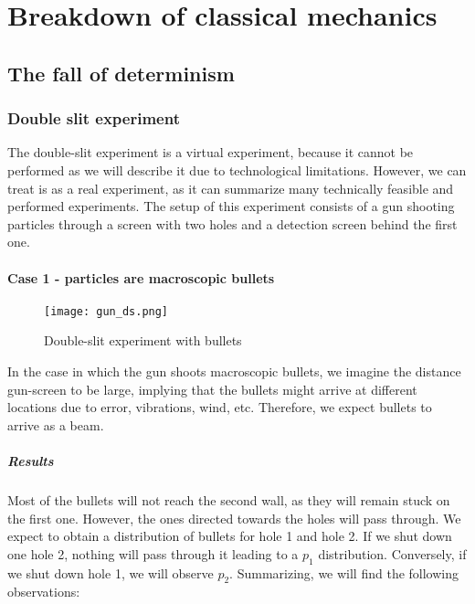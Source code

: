 \graphicspath{{chapters/02/}}
\chapter{Breakdown of classical mechanics}

\section{The fall of determinism}

  \subsection{Double slit experiment}
  The double-slit experiment is a virtual experiment, because it cannot be performed as we will describe it due to technological limitations.
  However, we can treat is as a real experiment, as it can summarize many technically feasible and performed experiments.
  The setup of this experiment consists of a gun shooting particles through a screen with two holes and a detection screen behind the first one.

  \subsubsection{Case 1 - particles are macroscopic bullets}

  \begin{figure}[h!]
    \centering
    \texttt{[image: gun\_ds.png]}
    \caption{\label{fig:gun_ds} Double-slit experiment with bullets}
  \end{figure}

  In the case in which the gun shoots macroscopic bullets, we imagine the distance gun-screen to be large, implying that the bullets might arrive at different locations due to error, vibrations, wind, etc.
  Therefore, we expect bullets to arrive as a beam.

    \paragraph{Results}
    Most of the bullets will not reach the second wall, as they will remain stuck on the first one.
    However, the ones directed towards the holes will pass through.
    We expect to obtain a distribution of bullets for hole 1 and hole 2.
    If we shut down one hole 2, nothing will pass through it leading to a $p_1$ distribution.
    Conversely, if we shut down hole 1, we will observe $p_2$.
    Summarizing, we will find the following observations:

